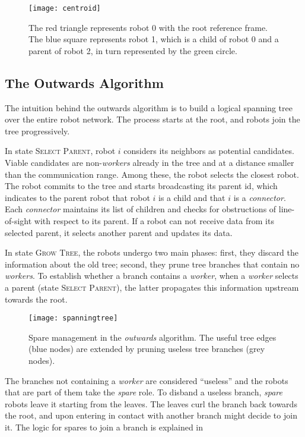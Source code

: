 \begin{figure}[t]
  \centering
  \texttt{[image: centroid]}
  \caption{The red triangle represents robot 0 with the root reference
    frame. The blue square represents robot 1, which is a child of
    robot 0 and a parent of robot 2, in turn represented by the green
    circle.}
  \label{fig:centroid}
\end{figure}

\subsection{The Outwards Algorithm}
\label{sec:outwardsalg}
The intuition behind the outwards algorithm is to build a logical
spanning tree over the entire robot network. The process starts at the
root, and robots join the tree progressively.

In state \textsc{Select Parent}, robot $i$ considers its neighbors as
potential candidates. Viable candidates are non-\emph{workers} already
in the tree and at a distance smaller than the communication
range. Among these, the robot selects the closest robot. The robot
commits to the tree and starts broadcasting its parent id, which
indicates to the parent robot that robot $i$ is a child and that $i$
is a \emph{connector}. Each \emph{connector} maintains its list of
children and checks for obstructions of line-of-sight with respect to
its parent. If a robot can not receive data from its selected parent,
it selects another parent and updates its data.

In state \textsc{Grow Tree}, the robots undergo two main phases:
first, they discard the information about the old tree; second, they
prune tree branches that contain no \emph{workers}. To establish
whether a branch contains a \emph{worker}, when a \emph{worker}
selects a parent (state \textsc{Select Parent}), the latter propagates
this information upstream towards the root.

\begin{figure}[t]
  \centering
  \texttt{[image: spanningtree]}
  \caption{Spare management in the \emph{outwards} algorithm. The
    useful tree edges (blue nodes) are extended by pruning useless
    tree branches (grey nodes).}
  \label{fig:outwardsspare}
\end{figure}
The branches not containing a \emph{worker} are considered ``useless''
and the robots that are part of them take the \emph{spare} role. To
disband a useless branch, \emph{spare} robots leave it starting from
the leaves. The leaves curl the branch back towards the root, and upon
entering in contact with another branch might decide to join it. The
logic for spares to join a branch is explained in

